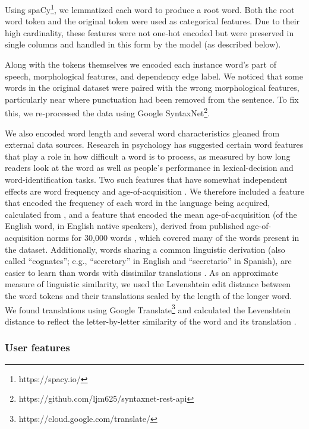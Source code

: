 \documentclass[11pt,a4paper]{article}
\begin{document}
Using spaCy\footnote{https://spacy.io/}, we lemmatized each word to produce a root word. Both the root
word token and the original token were used as categorical features. Due to
their high cardinality, these features were not one-hot encoded but were
preserved in single columns and handled in this form by the model (as described
below).

Along with the tokens themselves we encoded each instance word's part of speech,
morphological features, and dependency edge label. We noticed that some words
in the original dataset were paired with the wrong morphological features,
particularly near where punctuation had been removed from the sentence. To fix
this, we re-processed the data using Google SyntaxNet\footnote{https://github.com/ljm625/syntaxnet-rest-api}.

We also encoded word length and several word characteristics gleaned from
external data sources. Research in psychology has suggested certain word features that play a role in how difficult a word is to process, as measured by how long readers look at the word as well as people's performance in lexical-decision and word-identification tasks. Two such features that have somewhat independent effects are word frequency \cite[i.e., how often does the word occur in natural language;][]{rayner1998eye} and age-of-acquisition \cite[i.e., the age at which children typically exhibit the word in their vocabulary;][]{brysbaert2011effects, ferrand2011comparing}. We therefore included a feature that encoded the frequency of each word in the language being acquired, calculated from \citet{robert_speer_2017_998161}, and a feature that encoded the mean age-of-acquisition (of the English word, in English native speakers), derived from published age-of-acquisition norms for 30,000 words \cite{Kuperman2012}, which covered many of the words present in the dataset. Additionally, words sharing a common linguistic derivation (also called ``cognates''; e.g., ``secretary'' in English and ``secretario'' in Spanish), are easier to learn than words with dissimilar translations \cite{de2000hard}. As an approximate measure of linguistic similarity, we used the Levenshtein edit distance between the word tokens and their translations scaled by the length of the longer word. We found translations using Google Translate\footnote{https://cloud.google.com/translate/} and calculated the Levenshtein distance to reflect the letter-by-letter similarity of the word and its translation \cite{hyyro2001explaining}. 

\subsubsection{User features}
\end{document}
